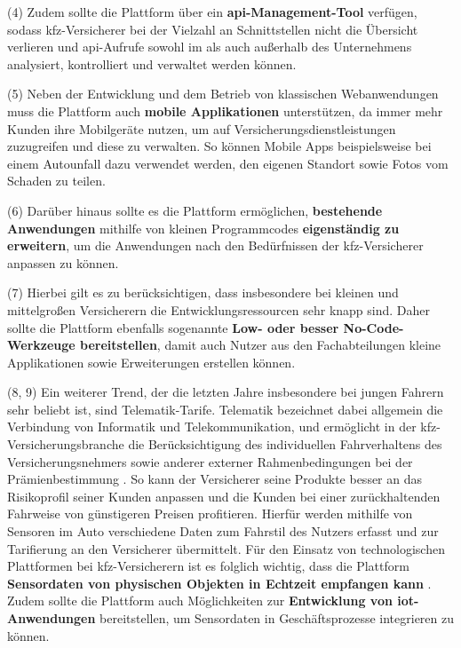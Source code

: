 (4) Zudem sollte die Plattform über ein \textbf{\ac{api}-Management-Tool} verfügen, sodass \ac{kfz}-Versicherer bei der Vielzahl an Schnittstellen nicht die Übersicht verlieren und \ac{api}-Aufrufe sowohl im als auch außerhalb des Unternehmens analysiert, kontrolliert und verwaltet werden können. \autocite[Vgl.][S. 67ff]{HANSCHKE2021}

(5) Neben der Entwicklung und dem Betrieb von klassischen Webanwendungen muss die Plattform auch \textbf{mobile Applikationen} unterstützen, da immer mehr Kunden ihre Mobilgeräte nutzen, um auf Versicherungsdienstleistungen zuzugreifen und diese zu verwalten. So können Mobile Apps beispielsweise bei einem Autounfall dazu verwendet werden, den eigenen Standort sowie Fotos vom Schaden zu teilen. \autocite[Vgl.][S. 7]{HU2020}

(6) Darüber hinaus sollte es die Plattform ermöglichen, \textbf{bestehende Anwendungen} mithilfe von kleinen Programmcodes \textbf{eigenständig zu erweitern}, um die Anwendungen nach den Bedürfnissen der \ac{kfz}-Versicherer anpassen zu können. \autocite[Vgl.][]{WEINGARTNER2023}

(7) Hierbei gilt es zu berücksichtigen, dass insbesondere bei kleinen und mittelgroßen Versicherern die Entwicklungsressourcen sehr knapp sind. Daher sollte die Plattform ebenfalls sogenannte \textbf{Low- oder besser No-Code-Werkzeuge bereitstellen}, damit auch Nutzer aus den Fachabteilungen kleine Applikationen sowie Erweiterungen erstellen können.\autocite[Vgl.][]{VBLOWCODE2022}

(8, 9) Ein weiterer Trend, der die letzten Jahre insbesondere bei jungen Fahrern sehr beliebt ist, sind Telematik-Tarife. Telematik bezeichnet dabei allgemein die Verbindung von Informatik und Telekommunikation, \autocite[Vgl.][S. 10-11]{ABTS2017} und ermöglicht in der \ac{kfz}-Versicherungsbranche die Berücksichtigung des individuellen Fahrverhaltens des Versicherungsnehmers sowie anderer externer Rahmenbedingungen bei der Prämienbestimmung \autocite[Vgl.][S. 84]{MERZINGER2017}. So kann der Versicherer seine Produkte besser an das Risikoprofil seiner Kunden anpassen und die Kunden bei einer zurückhaltenden Fahrweise von günstigeren Preisen profitieren. Hierfür werden mithilfe von Sensoren im Auto verschiedene Daten zum Fahrstil des Nutzers erfasst und zur Tarifierung an den Versicherer übermittelt. \autocite[Vgl.][S. 3-4]{ELING2020} Für den Einsatz von technologischen Plattformen bei \ac{kfz}-Versicherern ist es folglich wichtig, dass die Plattform \textbf{Sensordaten von physischen Objekten in Echtzeit empfangen kann} \autocite[Vgl.][S. 10-15]{WEICHERT2015}. Zudem sollte die Plattform auch Möglichkeiten zur \textbf{Entwicklung von \ac{iot}-Anwendungen} bereitstellen, um Sensordaten in Geschäftsprozesse integrieren zu können. 

